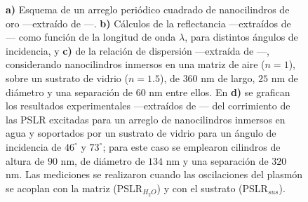 \begin{figure}[h!]
		\caption{\textbf{a)} Esquema de  un arreglo periódico cuadrado de nanocilindros de oro ---extraído de  \cite{kabashin2009plasmonic}---. \textbf{b)} Cálculos de la reflectancia ---extraídos de  \cite{kabashin2009plasmonic}--- como función de la longitud de onda $\lambda$, para distintos ángulos de incidencia, y \textbf{c)} de la relación de dispersión ---extraída de  \cite{kabashin2009plasmonic}---, considerando nanocilindros inmersos en una matriz de aire ($n=1$), sobre un sustrato de vidrio ($n=1.5$), de $360$ nm de largo, $25$ nm de diámetro y una separación de $60$ nm entre ellos. En \textbf{d)} se grafican los resultados experimentales ---extraídos de  \cite{danilov2018ultra}--- del corrimiento de las PSLR excitadas para un arreglo de nanocilindros inmersos en agua y soportados por un sustrato de vidrio para un ángulo de incidencia de $46^\circ$ y $73^\circ$; para este caso se emplearon cilindros de altura de $90$ nm, de diámetro de $134$ nm y una separación de $320$ nm. Las mediciones se realizaron cuando las oscilaciones del plasmón se acoplan con la matriz (PSLR$_{H_2{O}}$) y con el sustrato (PSLR$_{sus}$).}\label{fig:GraphsPapersNANOCILINDROS}
	\end{figure}

